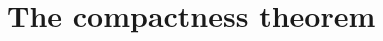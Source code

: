 \documentclass[creche.tex]{subfiles}
\begin{document}
\begin{comment}
In fact, direction $\IMP$ is trivial and, as for $\PMI$, we choose as $\hat b$ a sequence that picks a witness of $M_i\models\E y\,\phi(\hat a i,y)$ if it exists, some arbitrary element of $M_i$ otherwise.



\ssf{2}$\IFF$\ssf{3} This is Proposition~\ref{prop_pseudomodel}.


\ssf{2}$\IMP$\ssf{1} By straightforward induction on the syntax of $\phi(x)$  
\end{proof}


\begin{proposition}
For every sentence $\phi\in L$ the following are equivalent
\begin{itemize}
\item[1.] $\phi$ is a tautology;
\item[2.] $\phi^M=1_\BB$ for every $\BB$-model $M$.
\end{itemize}
\end{proposition}
\begin{proof}
\ssf{1}$\IMP$\ssf{2} As observed above classical model are in particular Boolean models. 

\ssf{2}$\IMP$\ssf{1} By straightforward induction on the syntax of $\phi(x)$  
\end{proof}



\begin{proposition}
For every sentence $\phi\in L$ the following are equivalent
\begin{itemize}
\item[1.] $\phi$ is a tautology;
\item[2.] $\phi^M=1_\BB$ for every $\BB$-model $M$.
\end{itemize}
\end{proposition}
\begin{proof}
\ssf{1}$\IMP$\ssf{2} As observed above classical model are in particular Boolean models. 

\ssf{2}$\IMP$\ssf{1} By straightforward induction on the syntax of $\phi(x)$  
\end{proof}

\end{comment}
\section{The compactness theorem}\label{compactness}
\def\medrel#1{\parbox[t]{6ex}{$\displaystyle\hfil #1$}}
\def\ceq#1#2#3{\parbox{25ex}{$\displaystyle #1$}\medrel{#2}$\displaystyle  #3$}
\end{document}
